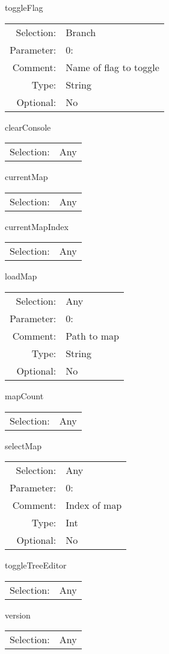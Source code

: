 \item toggleFlag\\
\begin{tabular}{rl}
  Selection: & Branch\\
   Parameter: &  0:\\
        Comment: & Name of flag to toggle\\
           Type: & String\\
       Optional: &  No\\
\end{tabular}

\item clearConsole\\
\begin{tabular}{rl}
  Selection: & Any\\
\end{tabular}

\item currentMap\\
\begin{tabular}{rl}
  Selection: & Any\\
\end{tabular}

\item currentMapIndex\\
\begin{tabular}{rl}
  Selection: & Any\\
\end{tabular}

\item loadMap\\
\begin{tabular}{rl}
  Selection: & Any\\
   Parameter: &  0:\\
        Comment: & Path to map\\
           Type: & String\\
       Optional: &  No\\
\end{tabular}

\item mapCount\\
\begin{tabular}{rl}
  Selection: & Any\\
\end{tabular}

\item selectMap\\
\begin{tabular}{rl}
  Selection: & Any\\
   Parameter: &  0:\\
        Comment: & Index of map\\
           Type: & Int\\
       Optional: &  No\\
\end{tabular}

\item toggleTreeEditor\\
\begin{tabular}{rl}
  Selection: & Any\\
\end{tabular}

\item version\\
\begin{tabular}{rl}
  Selection: & Any\\
\end{tabular}

